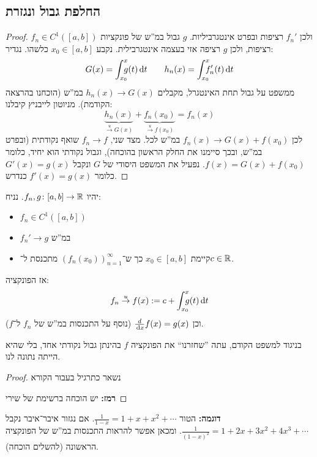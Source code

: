 \documentclass[]{../../../../tex/classes/styledArticle}
\begin{document}
	\subsection*{החלפת גבול ונגזרת}
	\begin{proof}
		$f_n \in C^{1}([a, b])$ ולכן $f_n'$ רציפות ובפרט אינטגרביליות. $g$ גבול במ''ש של פונקציות רציפות, ולכן $g$ רציפה אזי בעצמה אינטגרבילית. נקבע $x_0 \in [a, b]$ כלשהו. נגדיר: 
		\[ G(x) = \int^{x}_{x_0} \dequad \ g(t)\dt \quad\quad h_n(x) = \int^{x}_{x_0}\dequad \ f_n'(t)\dt \]
		ממשפט על גבול תחת האינטגרל, מקבלים $h_n(x) \to G(x)$ במ''ש (הוכחנו בהרצאה הקודמת). מניוטון לייבניץ קיבלנו: 
		\[ \underbrace{h_n(x)}_{\overset{u}{\to}G(x)} + \underbrace{f_n(x_0)}_{\overset{u}{\to}f(x_0)} = f_n(x) \]
		לכן $f_n(x) \to G(x) + f(x_0)$ במ''ש לכל. מצד שני, $f_n \to f$ שואף נקודתית (ובפרט במ''ש, ובכך סיימנו את החלק הראשון בהוכחה), וגבול נקודתי הוא יחיד, כלומר $f(x) = G(x) + f(x_0)$. נפעיל את המשפט היסודי של $G$ ונקבל $G'(x) = g(x)$ כלומר $f'(x) = g(x)$ כנדרש. 
	\end{proof}
	\begin{Theorem}
		יהיו $f_n, g \colon [a, b] \to \mathbb{R}$. נניח: 
		\begin{itemize}
			\item $f_n \in C^{1}([a, b])$
			\item $f_n' \to g$ במ''ש
			\item קיימת $x_0 \in [a, b]$ כך ש־$(f_n(x_0))^{\infty}_{n = 1}$ מתכנסת ל־$c \in \mathbb{R}$. 
		\end{itemize}
		אז הפונקציה: 
		\[ f_n\overset{u}{\to} f(x) := c + \int^{x}_{x_0} \!\!\!\!\!\! \ g(t)\,\mathrm{d}t \]
		וכן $\frac{d}{\,\mathrm{d}x}f(x) = g(x)$ (נוסף על התכנסות במ''ש של $f_n$ ל־$f$). 
	\end{Theorem}
	בניגוד למשפט הקודם, עתה ''שחזרנו`` את הפונקציה $f$ בהינתן גבול נקודתי אחד, בלי שהיא הייתה נתונה לנו. 
	\begin{proof}
		נשאר כתרגיל בעבור הקורא
		
		\textbf{רמז: }יש הוכחה ברשימת של שירי
	\end{proof}
	\textbf{דוגמה: }הטור $\frac{1}{1 - x} = 1 + x + x^{2} + \cdots$. אם נגזור איבר־איבר נקבל $\frac{1}{(1 - x)^{2}} = 1 + 2x + 3x^{2} + 4x^{3} + \cdots$. ומכאן אפשר להראות התכנסות במ''ש של הפונקציה הראשונה (להשלים הוכחה). 
	
\end{document}
